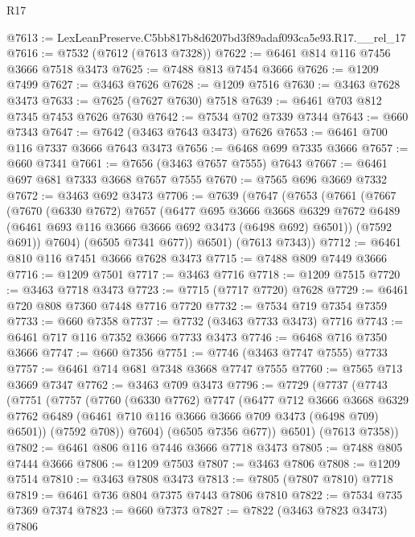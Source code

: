 \begin{lexlean}{R17}
\begin{coremodule}
@7613 := LexLeanPreserve.C5bb817b8d6207bd3f89adaf093ca5e93.R17.__rel_17
@7616 := @7532 (@7612 (@7613 @7328))
@7622 := @6461 @814 @116 @7456 @3666 @7518 @3473
@7625 := @7488 @813 @7454 @3666
@7626 := @1209 @7499
@7627 := @3463 @7626
@7628 := @1209 @7516
@7630 := @3463 @7628 @3473
@7633 := @7625 (@7627 @7630) @7518
@7639 := @6461 @703 @812 @7345 @7453 @7626 @7630
@7642 := @7534 @702 @7339 @7344
@7643 := @660 @7343
@7647 := @7642 (@3463 @7643 @3473) @7626
@7653 := @6461 @700 @116 @7337 @3666 @7643 @3473
@7656 := @6468 @699 @7335 @3666
@7657 := @660 @7341
@7661 := @7656 (@3463 @7657 @7555) @7643
@7667 := @6461 @697 @681 @7333 @3668 @7657 @7555
@7670 := @7565 @696 @3669 @7332
@7672 := @3463 @692 @3473
@7706 := @7639
    (@7647
      (@7653
        (@7661
          (@7667
            (@7670
              (@6330 @7672)
              @7657
              (@6477
                @695
                @3666
                @3668
                @6329
                @7672
                @6489
                (@6461 @693 @116 @3666 @3666 @692 @3473 (@6498 @692) @6501))
              (@7592 @691))
            @7604)
          (@6505 @7341 @677))
        @6501)
      (@7613 @7343))
@7712 := @6461 @810 @116 @7451 @3666 @7628 @3473
@7715 := @7488 @809 @7449 @3666
@7716 := @1209 @7501
@7717 := @3463 @7716
@7718 := @1209 @7515
@7720 := @3463 @7718 @3473
@7723 := @7715 (@7717 @7720) @7628
@7729 := @6461 @720 @808 @7360 @7448 @7716 @7720
@7732 := @7534 @719 @7354 @7359
@7733 := @660 @7358
@7737 := @7732 (@3463 @7733 @3473) @7716
@7743 := @6461 @717 @116 @7352 @3666 @7733 @3473
@7746 := @6468 @716 @7350 @3666
@7747 := @660 @7356
@7751 := @7746 (@3463 @7747 @7555) @7733
@7757 := @6461 @714 @681 @7348 @3668 @7747 @7555
@7760 := @7565 @713 @3669 @7347
@7762 := @3463 @709 @3473
@7796 := @7729
    (@7737
      (@7743
        (@7751
          (@7757
            (@7760
              (@6330 @7762)
              @7747
              (@6477
                @712
                @3666
                @3668
                @6329
                @7762
                @6489
                (@6461 @710 @116 @3666 @3666 @709 @3473 (@6498 @709) @6501))
              (@7592 @708))
            @7604)
          (@6505 @7356 @677))
        @6501)
      (@7613 @7358))
@7802 := @6461 @806 @116 @7446 @3666 @7718 @3473
@7805 := @7488 @805 @7444 @3666
@7806 := @1209 @7503
@7807 := @3463 @7806
@7808 := @1209 @7514
@7810 := @3463 @7808 @3473
@7813 := @7805 (@7807 @7810) @7718
@7819 := @6461 @736 @804 @7375 @7443 @7806 @7810
@7822 := @7534 @735 @7369 @7374
@7823 := @660 @7373
@7827 := @7822 (@3463 @7823 @3473) @7806

\end{coremodule}
\end{lexlean}
